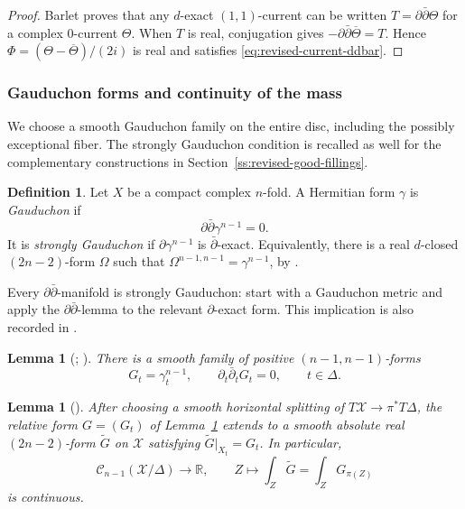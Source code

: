 \documentclass[11pt]{amsart}
\numberwithin{equation}{section}
\theoremstyle{plain}
\newtheorem{lemma}[thm]{Lemma}
\theoremstyle{definition}
\newtheorem{defn}[thm]{Definition}
\newcommand{\R}{\mathbb R}
\newcommand{\cC}{\mathcal C}
\newcommand{\cX}{\mathcal X}
\begin{document}
\begin{proof}
Barlet proves that any $d$-exact $(1,1)$-current can be written
$T=\partial\bar\partial\Theta$ for a complex $0$-current $\Theta$.  When $T$ is real, conjugation gives
$-\partial\bar\partial\overline\Theta=T$.  Hence
$\Phi=(\Theta-\overline\Theta)/(2i)$ is real and satisfies
\eqref{eq:revised-current-ddbar}.
\end{proof}

\subsubsection{Gauduchon forms and continuity of the mass}
We choose a smooth Gauduchon family on the entire disc, including the
possibly exceptional fiber.  The strongly Gauduchon condition is recalled
as well for the complementary constructions in
Section~\ref{ss:revised-good-fillings}.

\begin{defn}\label{def:revised-gauduchon}
Let $X$ be a compact complex $n$-fold.  A Hermitian form $\gamma$ is
\emph{Gauduchon} if
\[
 \partial\bar\partial\gamma^{n-1}=0.
\]
It is \emph{strongly Gauduchon} if
$\partial\gamma^{n-1}$ is $\bar\partial$-exact.  Equivalently, there is a
real $d$-closed $(2n-2)$-form $\Omega$ such that
$\Omega^{n-1,n-1}=\gamma^{n-1}$, by
\cite[Definition~4.1 and Proposition~4.2]{Po13}.
\end{defn}

Every $\partial\bar\partial$-manifold is strongly Gauduchon: start with a
Gauduchon metric and apply the $\partial\bar\partial$-lemma to the relevant
$\partial$-exact form.  This implication is also recorded in
\cite[p.~530]{Po13}.

\begin{lemma}[{\cite{Ga77}; \cite[\S~3]{Po13}}]
\label{lem:revised-smooth-gauduchon}
There is a smooth family of positive $(n-1,n-1)$-forms
\begin{equation*}
 G_t=\gamma_t^{n-1},\qquad
 \partial_t\bar\partial_tG_t=0,
 \qquad t\in\Delta.
\end{equation*}
\end{lemma}

\begin{lemma}[{\cite[Proposition~4.2.17.(2)]{BM19}}]
\label{lem:revised-absolute-G}
After choosing a smooth horizontal splitting of
$T\cX\to\pi^*T\Delta$, the relative form $G=(G_t)$ of
Lemma~\ref{lem:revised-smooth-gauduchon} extends to a smooth absolute real
$(2n-2)$-form $\widetilde G$ on $\cX$ satisfying
$\widetilde G|_{X_t}=G_t$.  In particular,
\begin{equation*}
 \cC_{n-1}(\cX/\Delta)\longrightarrow\R,
 \qquad Z\longmapsto\int_Z\widetilde G=\int_ZG_{\pi(Z)}
\end{equation*}
is continuous.
\end{lemma}
\end{document}
